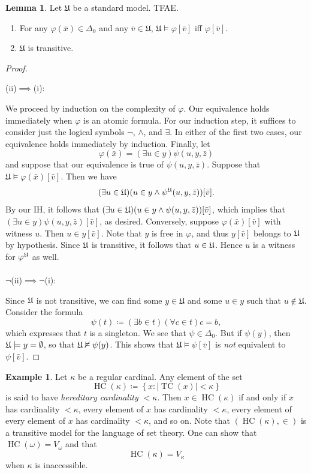 \documentclass[10pt,letterpaper,cm]{nupset}
\theoremstyle{definition}
\newtheorem{exmp}[definition]{Example}
\theoremstyle{theorem}
\newtheorem{lemma}[definition]{Lemma}
\theoremstyle{remark}
\newcommand{\1}{\mathbf{1}}
\newcommand{\0}{\vec 0}
\DeclareMathOperator{\hc}{HC}
\DeclareMathOperator{\tc}{TC}
\newcommand{\be}{\begin{enumerate}}
\newcommand{\ee}{\end{enumerate}}
\begin{document}
\begin{lemma}\label{d0abs}
 Let $\mathfrak{U}$ be a standard model. TFAE. 
\be[label=(\roman*)]
\item For any $\varphi(\bar{x}) \in \Delta_0$ and any $\bar{v} \in \mathfrak{U}$, $\mathfrak{U} \models \varphi[\bar{v}]$ iff $\varphi[\bar{v}]$.
\item $\mathfrak{U}$ is transitive.
\ee
\end{lemma}
\begin{proof} $ $

\smallskip

(ii)$\implies$(i):

We proceed by induction on the complexity of $\varphi$. Our equivalence holds immediately when $\varphi$ is an atomic formula.  For our induction step, it suffices to consider just the logical symbols $\neg$, $\land$, and $\exists$. In either of the first two cases, our equivalence holds immediately by induction.  Finally, let $$\varphi(\bar{x}) = (\exists u \in y)\psi(u, y, \bar{z})$$ and suppose that our equivalence is true of $\psi(u, y, \bar{z})$. Suppose that $\mathfrak{U} \models \varphi(\bar{x})[\bar{v}]$. Then we have $$(\exists u\in \frak{U})(u \in y \land \psi^{\frak{U}}(u, y, \bar{z}))[\bar{v}].$$ By our IH, it follows that $(\exists u\in \frak{U})(u \in y \land \psi(u, y, \bar{z}))[\bar{v}]$, which implies that $(\exists u \in y) \psi(u, y, \bar{z})[\bar{v}]$, as desired. Conversely, suppose $\varphi(\bar{x})[\bar{v}]$ with witness $u$. Then $u\in y[\bar{v}]$.  Note that $y$ is free in $\varphi$, and thus $y[\bar{v}]$ belongs to $\frak{U}$ by hypothesis. Since $\frak{U}$ is transitive, it follows that $u\in \frak{U}$. Hence $u$ is a witness for $\varphi^{\frak{U}}$ as well. 
\\ \\
$\neg$(ii)$\implies \neg$(i): 

Since $\frak{U}$ is not transitive, we can find some $y\in \mathfrak{U}$ and some $u\in y$ such that $u\notin \mathfrak{U}$. Consider the formula $$\psi(t) \coloneqq (\exists b \in t)(\forall c \in t)c=b,$$ which expresses that $t$ is a singleton. We see that $\psi \in \Delta_0$. But if $\psi(y)$, then $\frak{U} \models y = \emptyset$, so that $\frak{U} \nvDash \psi(y)$. This shows that $\mathfrak{U} \models \psi[\bar{v}]$ is \emph{not} equivalent to $\psi[\bar{v}]$.
\end{proof}

\begin{exmp}
Let $\kappa$ be a regular cardinal. Any element of the set $$\hc(\kappa) \coloneqq \left\{x : \lvert{\tc(x)}\rvert < \kappa\right\} $$ is said to have \textit{hereditary cardinality $<\kappa$}. Then $x \in \hc(\kappa)$ if and only if $x$ has cardinality $< \kappa$, every element of $x$ has cardinality $< \kappa$, every element of every element of $x$ has cardinality $< \kappa$, and so on. Note that $(\hc(\kappa), \in) $ is a transitive model for the language of set theory.  One can show that $\hc(\omega) = V_{\omega}$ and that 
\[ \label{eqn:si}
\hc(\kappa) =V_{\kappa} \tag{$\star$}
\]
when $\kappa$ is inaccessible. 
\end{exmp}
\end{document}

